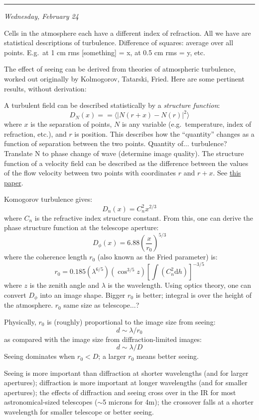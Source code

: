 \documentclass[12pt]{article}
\newcommand{\mynotes}[1]{\textcolor{myBlue}{#1}}
\newcommand{\mydate}[1]{
    \begin{flushright}
        \rule{\textwidth}{0.4pt} %
        \footnotesize\hfill\textit{#1}
    \end{flushright}}
\begin{document}
\mydate{Wednesday, February 24}

\mynotes{Cells in the atmosphere each have a different index of refraction. All
we have are statistical descriptions of turbulence. Difference of squares:
average over all points. E.g.\ at 1 cm rms [something] = x, at 0.5 cm rms = y,
etc.}

The effect of seeing can be derived from theories of atmospheric turbulence,
worked out originally by Kolmogorov, Tatarski, Fried. Here are some pertinent
results, without derivation:

A turbulent field can be described statistically by a \textit{structure
function}:
\[
    D_{N}(x) = = \langle | N(r+x) - N(r) | ^{2} \rangle
    \]
where $x$ is the separation of points, $N$ is any variable (e.g.\ temperature,
index of refraction, etc.), and $r$ is position.
\mynotes{This describes how the
``quantity'' changes as a function of separation between the two points.
Quantity of$\ldots$ turbulence?
Translate N to phase change of wave (determine image quality).
The structure function of a velocity field can be described as the
difference between the values of the flow velocity between two points
with coordinates $r$ and $r+x$. See \href{http://jetp.ac.ru/cgi-bin/dn/e_082_03_0580.pdf}
{this paper}.}

Komogorov turbulence gives:
\[
    D_{n}(x) = C_{n}^{2}x^{2/3}
    \]
where $C_{n}$ is the refractive index structure constant. From this, one can
derive the phase structure function at the telescope aperture:
\[
    D_{\phi}(x) = 6.88 \left( \frac{x}{r_{0}} \right) ^{5/3}
    \]
where the coherence length $r_{0}$ (also known as the Fried parameter) is:
\[
    r_{0} = 0.185\left( \lambda^{6/5} \right)
    \left( \cos^{3/5}z \right)
    \left[ \int \left( C_{n}^{2}\textrm{d}h \right)\right]^{-3/5}
    \]
where $z$ is the zenith angle and $\lambda$ is the wavelength.
Using optics theory, one can convert $D_{\phi}$ into an image shape.
\mynotes{Bigger $r_{0}$ is better; integral is over the height
of the atmosphere. $r_{0}$ same size as telescope$\ldots$?}

Physically, $r_{0}$ is (roughly) proportional to the image size from
seeing:
\[
    d \sim \lambda/r_{0}
    \]
as compared with the image size from diffraction-limited images:
\[
    d \sim \lambda/D
    \]
Seeing dominates when $r_{0} < D$; a larger $r_{0}$ means better seeing.

Seeing is more important than diffraction at shorter wavelengths (and for
larger apertures); diffraction is more important at longer wavelengths (and for
smaller apertures); the effects of diffraction and seeing cross over in the IR
for most astronomical-sized telescopes ($\sim$5 microns for 4m); the crossover
falls at a shorter wavelength for smaller telescope or better seeing.
\end{document}
